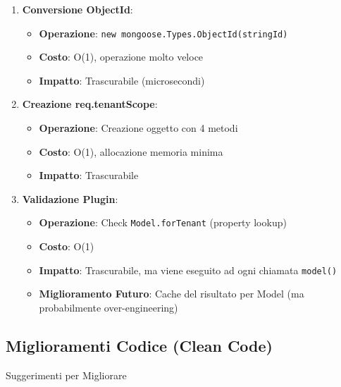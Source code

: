 \documentclass[11pt,a4paper]{article}
\begin{document}
\begin{enumerate}
    \item \textbf{Conversione ObjectId}:
    \begin{itemize}
        \item \textbf{Operazione}: \texttt{new mongoose.Types.ObjectId(stringId)}
        \item \textbf{Costo}: O(1), operazione molto veloce
        \item \textbf{Impatto}: Trascurabile (microsecondi)
    \end{itemize}
    
    \item \textbf{Creazione req.tenantScope}:
    \begin{itemize}
        \item \textbf{Operazione}: Creazione oggetto con 4 metodi
        \item \textbf{Costo}: O(1), allocazione memoria minima
        \item \textbf{Impatto}: Trascurabile
    \end{itemize}
    
    \item \textbf{Validazione Plugin}:
    \begin{itemize}
        \item \textbf{Operazione}: Check \texttt{Model.forTenant} (property lookup)
        \item \textbf{Costo}: O(1)
        \item \textbf{Impatto}: Trascurabile, ma viene eseguito ad ogni chiamata \texttt{model()}
        \item \textbf{Miglioramento Futuro}: Cache del risultato per Model (ma probabilmente over-engineering)
    \end{itemize}
\end{enumerate}

\subsection{Miglioramenti Codice (Clean Code)}

\begin{tipbox}{Suggerimenti per Migliorare}
\end{tipbox}
\end{document}

